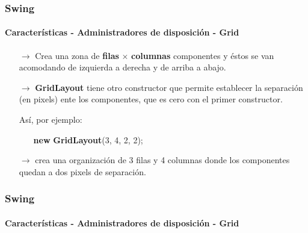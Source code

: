 \documentclass{beamer}
\begin{document}
	\begin{frame}
		\frametitle{Swing}
		\framesubtitle{Caracter\'isticas - Administradores de disposici\'on - Grid}

	    \begin{itemize}
		    \item[$\rightarrow$] Crea una zona de \textbf{filas} $\times$ \textbf{columnas} componentes y \'estos se van acomodando de izquierda a derecha y de arriba a abajo.
		    \item[$\rightarrow$] \textbf{GridLayout} tiene otro constructor que permite establecer la separaci\'on (en pixels) ente los componentes, que es cero con el primer constructor.
		    \item[] As\'i, por ejemplo:
            	    \begin{itemize}
		    		    \item[] \textbf{new} \textbf{GridLayout}(3, 4, 2, 2);
		    	    \end{itemize}
		    \item[$\rightarrow$] crea una organizaci\'on de 3 filas y 4 columnas donde los componentes quedan a dos pixels de separaci\'on.
        \end{itemize}
	\end{frame}

	\begin{frame}
		\frametitle{Swing}
		\framesubtitle{Caracter\'isticas - Administradores de disposici\'on - Grid}

	    \begin{center}
	    \end{center}
	\end{frame}
\end{document}

